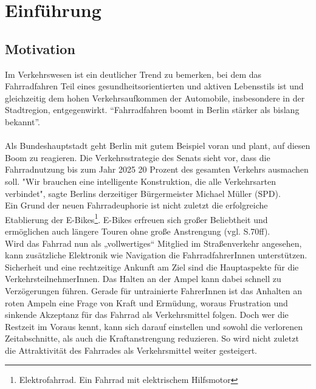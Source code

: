\chapter{\label{chap:einleitung}Einführung}
\section{Motivation}
Im Verkehrswesen ist ein deutlicher Trend zu bemerken, bei dem das Fahrradfahren Teil eines gesundheitsorientierten und aktiven Lebensstils ist und gleichzeitig dem hohen Verkehrsaufkommen der Automobile, insbesondere in der Stadtregion, entgegenwirkt. “Fahrradfahren boomt in Berlin stärker als bislang bekannt”. \cite{Mopo}\\\\
Als Bundeshauptstadt geht Berlin mit gutem Beispiel voran und plant, auf diesen Boom zu reagieren. Die Verkehrsstrategie des Senats sieht vor, dass die Fahrradnutzung bis zum Jahr 2025 20 Prozent des gesamten Verkehrs ausmachen soll. "Wir brauchen eine intelligente Konstruktion, die alle Verkehrsarten verbindet", sagte Berlins derzeitiger Bürgermeister Michael Müller (SPD). \cite{Mopo}\\
Ein Grund der neuen Fahrradeuphorie ist nicht zuletzt die erfolgreiche Etablierung der E-Bikes\footnote{ Elektrofahrrad. Ein Fahrrad mit elektrischem Hilfsmotor}. E-Bikes erfreuen sich großer Beliebtheit und ermöglichen auch längere Touren ohne große Anstrengung (vgl. \cite{ebikes} S.70ff).\\ 
Wird das Fahrrad nun als „vollwertiges“ Mitglied im Straßenverkehr angesehen, kann zusätzliche Elektronik wie Navigation die FahrradfahrerInnen unterstützen. Sicherheit und eine rechtzeitige Ankunft am Ziel sind die Hauptaspekte für die VerkehrsteilnehmerInnen. Das Halten an der Ampel kann dabei schnell zu Verzögerungen führen. Gerade für untrainierte FahrerInnen ist das Anhalten an roten Ampeln eine Frage von Kraft und Ermüdung, woraus Frustration und sinkende Akzeptanz für das Fahrrad als Verkehrsmittel folgen. Doch wer die Restzeit im Voraus kennt, kann sich darauf einstellen und sowohl die verlorenen Zeitabschnitte, als auch die Kraftanstrengung reduzieren. So wird nicht zuletzt die Attraktivität des Fahrrades als Verkehrsmittel weiter gesteigert. 
\clearpage
